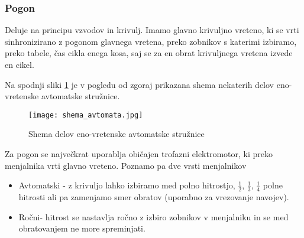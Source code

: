 \subsubsection{Pogon}
    Deluje na principu vzvodov in krivulj. Imamo glavno krivuljno 
    vreteno, ki se vrti sinhronizirano z pogonom glavnega vretena, 
    preko zobnikov s katerimi izbiramo, preko tabele, čas cikla enega 
    kosa, saj se za en obrat krivuljnega vretena izvede en cikel.

    Na spodnji sliki \ref{pogon} je v pogledu od zgoraj prikazana shema
    nekaterih delov eno-vretenske avtomatske stružnice.
    \begin{figure}[H]
        \begin{center}
            \texttt{[image: shema\_avtomata.jpg]}
            \caption{Shema delov eno-vretenske avtomatske stružnice
                    \cite{gauthier}}  
            \label{pogon} 
        \end{center}
    \end{figure}

    \noindent Za pogon se največkrat uporablja običajen trofazni elektromotor,
    ki preko menjalnika vrti glavno vreteno. Poznamo pa dve vrsti
    menjalnikov
    
    \begin{itemize}
        \item Avtomatski - z krivuljo lahko izbiramo med polno 
        hitrostjo, \( \frac{1}{2} \), \( \frac{1}{3} \), \( \frac{1}{4} \) 
        polne hitrosti ali pa zamenjamo 
        smer obratov (uporabno za vrezovanje navojev).

        \item Ročni- hitrost se nastavlja ročno z izbiro zobnikov 
        v menjalniku in se med obratovanjem ne more spreminjati.
    \end{itemize}
    \newpage

